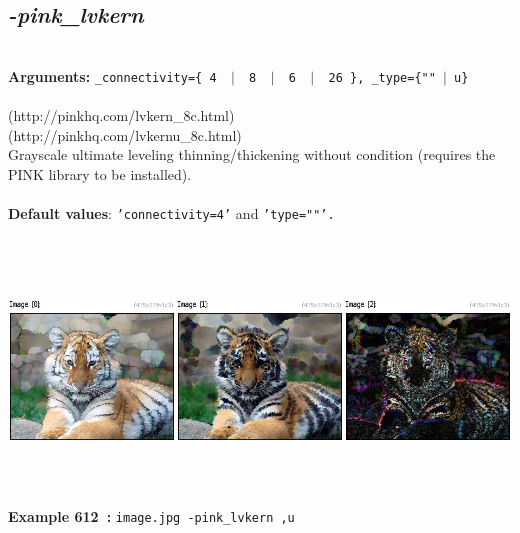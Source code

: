 \documentclass[a4paper,11pt,twoside]{book}
\begin{document}
\subsection{\emph{-pink\_lvkern} }\vspace*{-0.5em}
~\\\textbf{Arguments: } 
{\small \texttt{\_connectivity=\{ 4 ~$|$~ 8 ~$|$~ 6 ~$|$~ 26 \}, \_type=\{""~$|$~u\}}}\\~\\
(http://pinkhq.com/lvkern\_8c.html)
~\\(http://pinkhq.com/lvkernu\_8c.html)
~\\Grayscale ultimate leveling thinning/thickening without condition (requires the PINK library to be installed).
~\\~\\\textbf{Default values}: {\small \texttt{'connectivity=4'} and \texttt{'type=""'.}}
\begin{center}\includegraphics[keepaspectratio=true,height=7cm,width=\textwidth]{img/gmic_def612.jpg}\\
{\footnotesize \textbf{Example 612~:} \texttt{image.jpg -pink\_lvkern ,u}}
\end{center}
\end{document}
